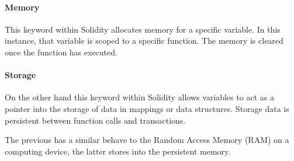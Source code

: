 \paragraph{Memory} This keyword within Solidity allocates memory for a specific variable. 
In this instance, that variable is scoped to a specific function. 
The memory is cleared once the function has executed.

\paragraph{Storage} On the other hand this keyword within Solidity allows variables to act as a pointer into the storage of data in mappings or data structures. 
Storage data is persistent between function calls and transactions. 

The previous has a similar behave to the Random Access Memory (RAM) on a computing device, the latter stores into the persistent memory.

